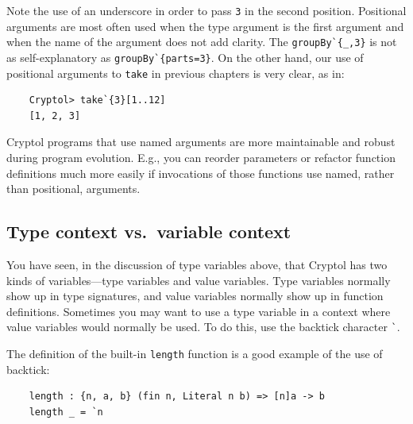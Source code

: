 Note the use of an underscore in order to pass \texttt{3} in the
second position.  Positional arguments are most often used when the
type argument is the first argument and when the name of the argument
does not add clarity.  The {\tt groupBy\Verb|`{_,3}|} is not as
self-explanatory as {\tt groupBy\Verb|`{parts=3}|}.  On the other hand, our
use of positional arguments to {\tt take} in previous chapters is very
clear, as in:
\begin{Verbatim}
    Cryptol> take`{3}[1..12]
    [1, 2, 3]
\end{Verbatim}

\begin{tip}
  Cryptol programs that use named arguments are more maintainable and
  robust during program evolution.  E.g., you can reorder parameters or
  refactor function definitions much more easily if invocations of
  those functions use named, rather than positional, arguments.
\end{tip}


\subsection{Type context vs.\ variable context}\indTypeContext
\label{sec:type-context-vs}

You have seen, in the discussion of type variables above, that Cryptol
has two kinds of variables---type variables and value variables. Type
variables normally show up in type signatures, and value variables
normally show up in function definitions. Sometimes you may want to
use a type variable in a context where value variables would normally
be used.  To do this, use the backtick character {\tt \Verb|`|}.

The definition of the built-in \texttt{length} function is a good example
of the use of backtick:
\begin{Verbatim}
    length : {n, a, b} (fin n, Literal n b) => [n]a -> b
    length _ = `n
\end{Verbatim}


